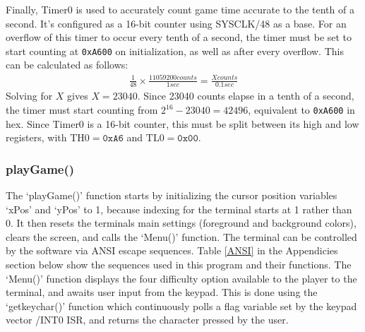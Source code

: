 \documentclass[12pt]{article}
\begin{document}
Finally, Timer0 is used to accurately count game time accurate to the tenth of a second. It's configured as a 16-bit counter using SYSCLK/48 as a base. For an overflow of this timer to occur every tenth of a second, the timer must be set to start counting at \texttt{0xA600} on initialization, as well as after every overflow. This can be calculated as follows:
\begin{gather*}
	\frac{1}{48}\times \frac{11059200 \si{counts}}{\si{1}{sec}}=\frac{X\si{counts}}{0.1\si{sec}}
\end{gather*}
Solving for $X$ gives $X=23040$. Since 23040 counts elapse in a tenth of a second, the timer must start counting from $2^{16}-23040=42496$, equivalent to \texttt{0xA600} in hex. Since Timer0 is a 16-bit counter, this must be split between its high and low registers, with $\mathrm{TH0}=\texttt{0xA6}$ and $\mathrm{TL0}=\texttt{0x00}$.

\subsubsection{playGame()}
The `playGame()' function starts by initializing the cursor position variables `xPos' and `yPos' to 1, because indexing for the terminal starts at 1 rather than 0. It then resets the terminals main settings (foreground and background colors), clears the screen, and calls the `Menu()' function. The terminal can be controlled by the software via ANSI escape sequences. Table \ref{ANSI} in the Appendicies section below show the sequences used in this program and their functions. The `Menu()' function displays the four difficulty option available to the player to the terminal, and awaits user input from the keypad. This is done using the `getkeychar()' function which continuously polls a flag variable set by the keypad vector /INT0 ISR, and returns the character pressed by the user.
\end{document}
